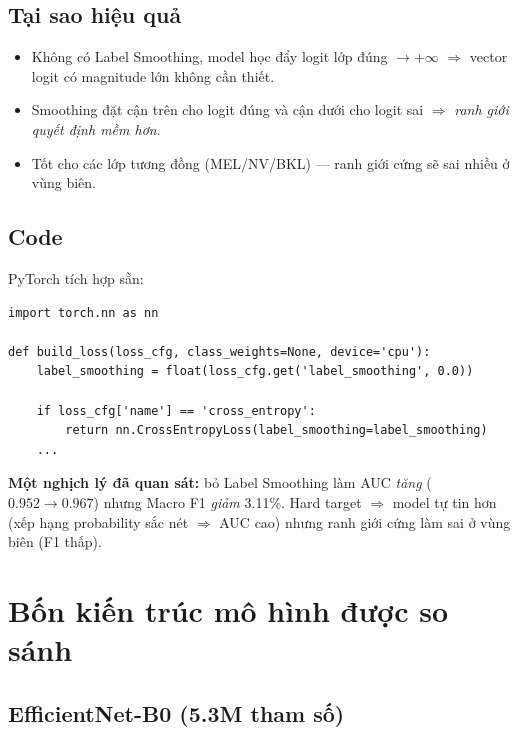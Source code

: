 \documentclass[11pt,a4paper]{article}
\begin{document}
\subsection{Tại sao hiệu quả}

\begin{itemize}[leftmargin=*]
  \item Không có Label Smoothing, model học đẩy logit lớp đúng $\to +\infty$ $\Rightarrow$ vector logit có magnitude lớn không cần thiết.
  \item Smoothing đặt cận trên cho logit đúng và cận dưới cho logit sai $\Rightarrow$ \textit{ranh giới quyết định mềm hơn}.
  \item Tốt cho các lớp tương đồng (MEL/NV/BKL) --- ranh giới cứng sẽ sai nhiều ở vùng biên.
\end{itemize}

\subsection{Code}

PyTorch tích hợp sẵn:

\begin{lstlisting}[caption={\texttt{src/models/losses.py}}]
import torch.nn as nn

def build_loss(loss_cfg, class_weights=None, device='cpu'):
    label_smoothing = float(loss_cfg.get('label_smoothing', 0.0))

    if loss_cfg['name'] == 'cross_entropy':
        return nn.CrossEntropyLoss(label_smoothing=label_smoothing)
    ...
\end{lstlisting}

\textbf{Một nghịch lý đã quan sát:} bỏ Label Smoothing làm AUC \textit{tăng} ($0.952 \to 0.967$) nhưng Macro F1 \textit{giảm} 3.11\%. Hard target $\Rightarrow$ model tự tin hơn (xếp hạng probability sắc nét $\Rightarrow$ AUC cao) nhưng ranh giới cứng làm sai ở vùng biên (F1 thấp).

\section{Bốn kiến trúc mô hình được so sánh}

\subsection{EfficientNet-B0 (5.3M tham số)}
\end{document}
